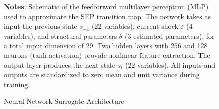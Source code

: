 \begin{figure}[h]
\caption{Neural Network Surrogate Architecture}
\label{fig:mlp_architecture}
\begin{flushleft}
\footnotesize
\textbf{Notes}: Schematic of the feedforward multilayer perceptron (MLP) used to approximate the SEP transition map. The network takes as input the previous state $s_{-1}$ (22 variables), current shock $\varepsilon$ (4 variables), and structural parameters $\theta$ (3 estimated parameters), for a total input dimension of 29. Two hidden layers with 256 and 128 neurons (tanh activation) provide nonlinear feature extraction. The output layer produces the next state $s_t$ (22 variables). All inputs and outputs are standardized to zero mean and unit variance during training.
\end{flushleft}
\end{figure}

\clearpage
